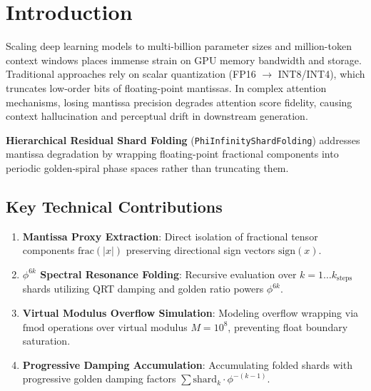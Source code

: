\section{Introduction}
Scaling deep learning models to multi-billion parameter sizes and million-token context windows places immense strain on GPU memory bandwidth and storage. Traditional approaches rely on scalar quantization (FP16 $\to$ INT8/INT4), which truncates low-order bits of floating-point mantissas. In complex attention mechanisms, losing mantissa precision degrades attention score fidelity, causing context hallucination and perceptual drift in downstream generation.

\textbf{Hierarchical Residual Shard Folding} (\texttt{PhiInfinityShardFolding}) addresses mantissa degradation by wrapping floating-point fractional components into periodic golden-spiral phase spaces rather than truncating them.

\subsection{Key Technical Contributions}
\begin{enumerate}[label=\textbf{\arabic*.}]
    \item \textbf{Mantissa Proxy Extraction}: Direct isolation of fractional tensor components $\text{frac}(|x|)$ preserving directional sign vectors $\text{sign}(x)$.
    \item \textbf{$\phi^{6k}$ Spectral Resonance Folding}: Recursive evaluation over $k = 1 \dots k_{\text{steps}}$ shards utilizing QRT damping and golden ratio powers $\phi^{6k}$.
    \item \textbf{Virtual Modulus Overflow Simulation}: Modeling overflow wrapping via $\text{fmod}$ operations over virtual modulus $M = 10^8$, preventing float boundary saturation.
    \item \textbf{Progressive Damping Accumulation}: Accumulating folded shards with progressive golden damping factors $\sum \text{shard}_k \cdot \phi^{-(k-1)}$.
\end{enumerate}
